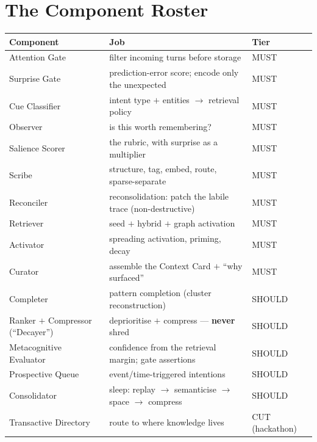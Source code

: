 \section{The Component Roster}
\begin{longtable}{@{}p{}p{}p{}@{}}
\toprule
Component & Job & Tier \\
\midrule
Attention Gate & filter incoming turns before storage & MUST \\
Surprise Gate & prediction-error score; encode only the unexpected & MUST \\
Cue Classifier & intent type $+$ entities $\rightarrow$ retrieval policy & MUST \\
Observer & is this worth remembering? & MUST \\
Salience Scorer & the rubric, with surprise as a multiplier & MUST \\
Scribe & structure, tag, embed, route, sparse-separate & MUST \\
Reconciler & reconsolidation: patch the labile trace (non-destructive) & MUST \\
Retriever & seed $+$ hybrid $+$ graph activation & MUST \\
Activator & spreading activation, priming, decay & MUST \\
Curator & assemble the Context Card $+$ ``why surfaced'' & MUST \\
Completer & pattern completion (cluster reconstruction) & SHOULD \\
Ranker $+$ Compressor (``Decayer'') & deprioritise $+$ compress --- \textbf{never} shred & SHOULD \\
Metacognitive Evaluator & confidence from the retrieval margin; gate assertions & SHOULD \\
Prospective Queue & event/time-triggered intentions & SHOULD \\
Consolidator & sleep: replay $\rightarrow$ semanticise $\rightarrow$ space $\rightarrow$ compress & SHOULD \\
Transactive Directory & route to where knowledge lives & CUT (hackathon) \\
\bottomrule
\end{longtable}

